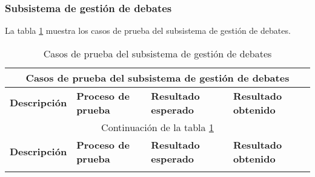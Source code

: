 \begin{landscape}
	 \subsubsection{Subsistema de gestión de debates}
	 	La tabla \ref{table:casos_prueba_debates} muestra los casos de prueba del subsistema de gestión de debates.
	 	
	 	\begin{longtable}[c]{|p{50mm}|p{50mm}|p{50mm}|p{50mm}|}
	 	 \caption{Casos de prueba del subsistema de gestión de debates\label{table:casos_prueba_debates}}\\
	 	
	 	 \hline
	 	 \multicolumn{4}{|c|}{\textbf{Casos de prueba del subsistema de gestión de debates}}\\
	 	 \hline
	 	 \textbf{Descripción} & \textbf{Proceso de prueba} & \textbf{Resultado esperado} & \textbf{Resultado obtenido}\\
	 	 \hline
	 	 \hline
	 	 \endfirsthead
	 	 
	 	 \hline
	 	 \multicolumn{4}{|c|}{Continuación de la tabla \ref{table:casos_prueba_debates}}\\
	 	 \hline
	 	 \textbf{Descripción} & \textbf{Proceso de prueba} & \textbf{Resultado esperado} & \textbf{Resultado obtenido}\\
	 	 \hline
	 	 \hline
	 	 \endhead
	 	 
	 	 \hline
	 	 \endfoot
	 	 

\end{longtable}
\end{landscape}
